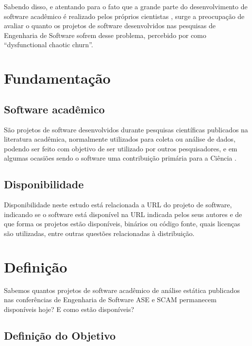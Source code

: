 Sabendo disso, e atentando para o fato que a grande parte do desenvolvimento de
software acadêmico é realizado pelos próprios cientistas \cite{hettrick2014uk,
momcheva2015software}, surge a preocupação de avaliar o quanto os projetos de
software desenvolvidos nas pesquisas de Engenharia de Software sofrem desse
problema, percebido por  como
``dysfunctional chaotic churn''.


\section{Fundamentação} \label{estudo1:fundamentacao} %

\subsection{Software acadêmico}

São projetos de software desenvolvidos durante pesquisas científicas publicados
na literatura acadêmica, normalmente utilizados para coleta ou análise de
dados, podendo ser feito com objetivo de ser utilizado por outros
pesquisadores, e em algumas ocasiões sendo o software uma contribuição primária
para a Ciência \cite{howison2011scientific}.

\subsection{Disponibilidade}

Disponibilidade neste estudo está relacionada a URL do projeto de software,
indicando se o software está disponível na URL indicada pelos seus autores e de
que forma os projetos estão disponíveis, binários ou código fonte, quais
licenças são utilizadas, entre outras questões relacionadas à distribuição.


\section{Definição} \label{estudo1:definicao} %

Sabemos quantos projetos de software acadêmico de análise estática publicados
nas conferências de Engenharia de Software ASE e SCAM permanecem disponíveis
hoje? E como estão disponíveis?

\subsection{Definição do Objetivo}

